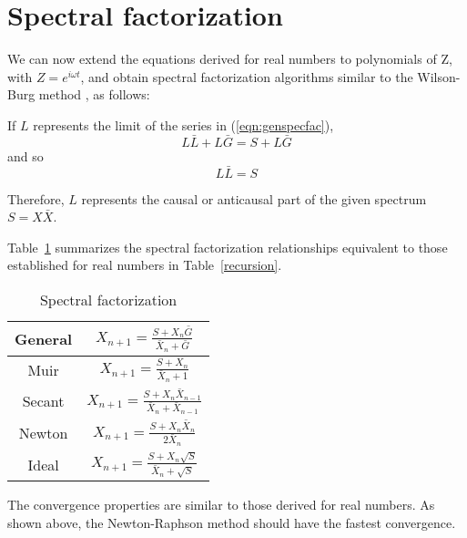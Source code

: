 \section{Spectral factorization}
We can now extend the equations derived for real numbers to
polynomials of Z, with $Z=e^{i\omega t}$, and obtain spectral
factorization algorithms similar to the Wilson-Burg method
\cite[]{Sava.sep.97.paul1}, as follows:
\beq \label{eqn:genspecfac}
 \eeq
\par
If $L$ represents the limit of the series in (\ref{eqn:genspecfac}),  
\[ L \bar{L} + L \bar{G} = S + L \bar{G} \] 
and so
\[ L \bar{L} = S\]
\par
Therefore, $L$ represents the causal or anticausal part of the given
spectrum $S=X\bar{X}$.
\par
Table~\ref{specfac} summarizes the spectral factorization
relationships equivalent to those established for real numbers in
Table~\ref{recursion}.
\begin{table} \center
\caption{Spectral factorization}
\label{specfac}
\begin{tabular}{|c|c|}\hline
\R General& $X_{n+1} =\frac{S+X_n \bar G      }{ \bar X_n+\bar G      }$\\\hline
\R Muir   & $X_{n+1} =\frac{S+X_n             }{ \bar X_n+1           }$\\\hline
\R Secant & $X_{n+1} =\frac{S+X_n \bar X_{n-1}}{ \bar X_n+\bar X_{n-1}}$\\\hline
\R Newton & $X_{n+1} =\frac{S+X_n \bar X_n    }{2\bar X_n             }$\\\hline
\R Ideal  & $X_{n+1} =\frac{S+X_n\sqrt{S}     }{ \bar X_n+\sqrt{S}    }$\\\hline
\end{tabular}
\end{table}
\par
The convergence properties are similar to those derived for
real numbers. As shown above, the Newton-Raphson method should have
the fastest convergence. 

